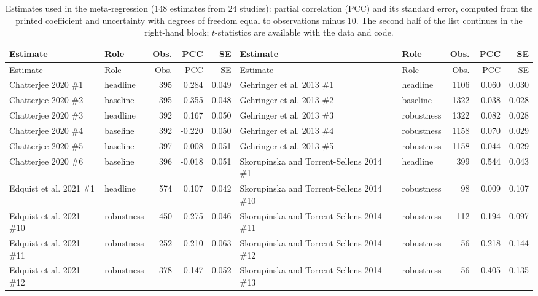 {\scriptsize\setlength{\tabcolsep}{3pt}
\begin{longtable}{@{}p{3.0cm} l r r r@{\hspace{0.8em}}p{3.0cm} l r r r@{}}
\caption{Estimates used in the meta-regression (148 estimates from 24 studies): partial correlation (PCC) and its standard error, computed from the printed coefficient and uncertainty with degrees of freedom equal to observations minus 10. The second half of the list continues in the right-hand block; $t$-statistics are available with the data and code.}\label{tab:mrainputs}\\
\toprule Estimate & Role & Obs. & PCC & SE & Estimate & Role & Obs. & PCC & SE \\ \midrule \endfirsthead
\toprule Estimate & Role & Obs. & PCC & SE & Estimate & Role & Obs. & PCC & SE \\ \midrule \endhead
\bottomrule \endfoot
Chatterjee 2020 \#1 & headline & 395 & 0.284 & 0.049 & Gehringer et al. 2013 \#1 & headline & 1106 & 0.060 & 0.030 \\
Chatterjee 2020 \#2 & baseline & 395 & -0.355 & 0.048 & Gehringer et al. 2013 \#2 & baseline & 1322 & 0.038 & 0.028 \\
Chatterjee 2020 \#3 & headline & 392 & 0.167 & 0.050 & Gehringer et al. 2013 \#3 & robustness & 1322 & 0.082 & 0.028 \\
Chatterjee 2020 \#4 & baseline & 392 & -0.220 & 0.050 & Gehringer et al. 2013 \#4 & robustness & 1158 & 0.070 & 0.029 \\
Chatterjee 2020 \#5 & baseline & 397 & -0.008 & 0.051 & Gehringer et al. 2013 \#5 & robustness & 1158 & 0.044 & 0.029 \\
Chatterjee 2020 \#6 & baseline & 396 & -0.018 & 0.051 & Skorupinska and Torrent-Sellens 2014 \#1 & headline & 399 & 0.544 & 0.043 \\
Edquist et al. 2021 \#1 & headline & 574 & 0.107 & 0.042 & Skorupinska and Torrent-Sellens 2014 \#10 & robustness & 98 & 0.009 & 0.107 \\
Edquist et al. 2021 \#10 & robustness & 450 & 0.275 & 0.046 & Skorupinska and Torrent-Sellens 2014 \#11 & robustness & 112 & -0.194 & 0.097 \\
Edquist et al. 2021 \#11 & robustness & 252 & 0.210 & 0.063 & Skorupinska and Torrent-Sellens 2014 \#12 & robustness & 56 & -0.218 & 0.144 \\
Edquist et al. 2021 \#12 & robustness & 378 & 0.147 & 0.052 & Skorupinska and Torrent-Sellens 2014 \#13 & robustness & 56 & 0.405 & 0.135 \\

\end{longtable}}
